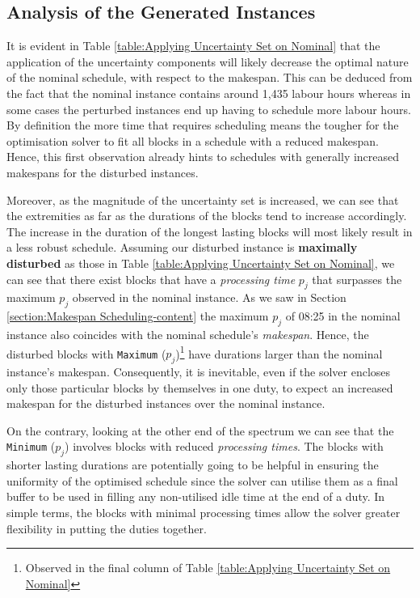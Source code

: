 \subsection*{Analysis of the Generated Instances}
\label{subsection: Analysis of  Disturbed Instances}
It is evident in Table \ref{table:Applying Uncertainty Set on Nominal} that the application of the uncertainty components will likely decrease the optimal nature of the nominal schedule, with respect to the makespan. This can be deduced from the fact that the nominal instance contains around 1,435 labour hours whereas in some cases the perturbed instances end up having to schedule more labour hours. By definition the more time that requires scheduling means the tougher for the optimisation solver to fit all blocks in a schedule with a reduced makespan. Hence, this first observation already hints to schedules with generally increased makespans for the disturbed instances. 

\vspace{\baselineskip}
\noindent
Moreover, as the magnitude of the uncertainty set is increased, we can see that the extremities as far as the durations of the blocks tend to increase accordingly. The increase in the duration of the longest lasting blocks will most likely result in a less robust schedule. Assuming our disturbed instance is \textbf{maximally disturbed} as those in Table \ref{table:Applying Uncertainty Set on Nominal}, we can see that there exist blocks that have a \textit{processing time} $p_j$ that surpasses the maximum $p_j$ observed in the nominal instance. As we saw in Section \ref{section:Makespan Scheduling-content} the maximum $p_j$ of 08:25 in the nominal instance also coincides with the nominal schedule's \textit{makespan}. Hence, the disturbed blocks with \texttt{Maximum} ($p_j$)\footnote{Observed in the final column of Table \ref{table:Applying Uncertainty Set on Nominal}} have durations larger than the nominal instance's makespan. Consequently, it is inevitable, even if the solver encloses only those particular blocks by themselves in one duty, to expect an increased makespan for the disturbed instances over the nominal instance. 

\vspace{\baselineskip}
\noindent
On the contrary, looking at the other end of the spectrum we can see that the \texttt{Minimum} ($p_j$) involves blocks with reduced \textit{processing times}. The blocks with shorter lasting durations are potentially going to be helpful in ensuring the uniformity of the optimised schedule since the solver can utilise them as a final buffer to be used in filling any non-utilised idle time at the end of a duty. In simple terms, the blocks with minimal processing times allow the solver greater flexibility in putting the duties together.

